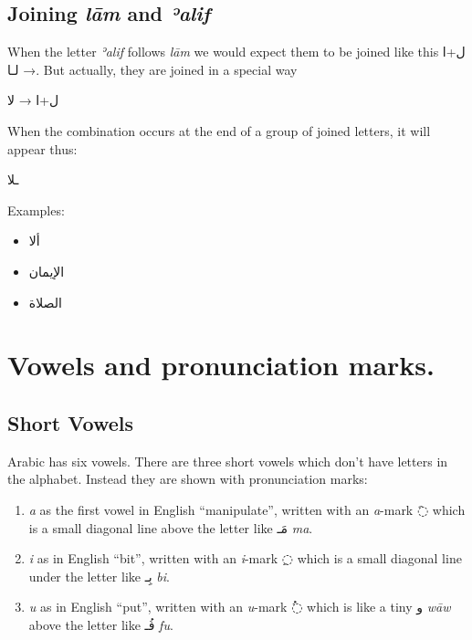 \documentclass[
  10pt,
]{book}
\providecommand{\tightlist}{%
  \setlength{\itemsep}{0pt}\setlength{\parskip}{0pt}}
\begin{document}
\subsection{\texorpdfstring{Joining \emph{lām} and \emph{ʾalif}}{Joining lām and ʾalif}}\label{joining-lam-and-ealif}

When the letter \emph{ʾalif} follows \emph{lām} we would expect them to be joined like this \foreignlanguage{arabic}{ل+ا} → \foreignlanguage{arabic}{لـا}. But actually, they are joined in a special way

\foreignlanguage{arabic}{ل+ا} → \foreignlanguage{arabic}{لا}

When the combination occurs at the end of a group of joined letters, it will appear thus:

\foreignlanguage{arabic}{ـلا}

Examples:

\begin{itemize}
\tightlist
\item
  \foreignlanguage{arabic}{ألا}
\item
  \foreignlanguage{arabic}{الإيمان}
\item
  \foreignlanguage{arabic}{الصلاة}
\end{itemize}

\section{Vowels and pronunciation marks.}\label{vowels-and-pronunciation-marks.}

\subsection{Short Vowels}\label{short-vowels}

Arabic has six vowels. There are three short vowels which don't have letters in the alphabet. Instead they are shown with pronunciation marks:

\begin{enumerate}
\def\labelenumi{\arabic{enumi}.}
\tightlist
\item
  \emph{a} as the first vowel in English \enquote{manipulate}, written with an \emph{a}-mark \foreignlanguage{arabic}{◌َ} which is a small diagonal line above the letter like \foreignlanguage{arabic}{مَـ} \emph{ma}.
\item
  \emph{i} as in English \enquote{bit}, written with an \emph{i}-mark \foreignlanguage{arabic}{◌ِ} which is a small diagonal line under the letter like \foreignlanguage{arabic}{بِـ} \emph{bi}.
\item
  \emph{u} as in English \enquote{put}, written with an \emph{u}-mark \foreignlanguage{arabic}{◌ُ} which is like a tiny \foreignlanguage{arabic}{و} \emph{wāw} above the letter like \foreignlanguage{arabic}{فُـ} \emph{fu}.
\end{enumerate}
\end{document}
